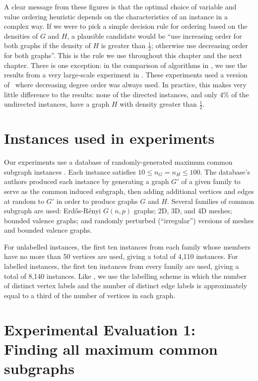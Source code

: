 A clear message from these figures is that the optimal choice of variable and
value ordering heuristic depends on the characteristics of an instance in a
complex way.  If we were to pick a simple decision rule for ordering based on
the densities of $G$ and $H$, a plausible candidate would be ``use increasing
order for both graphs if the density of $H$ is greater than $\frac{1}{2}$;
otherwise use decreasing order for both graphs''.  This is the rule we use
throughout this chapter and the next chapter.  There is one exception: in the
comparison of algorithms in , we use the
results from a very large-scale experiment in
\citet{DBLP:conf/ijcai/McCreeshPT17}. These experiments used a version of
\McSplit\ where decreasing degree order was always used.  In practice, this
makes very little difference to the results: none of the directed instances,
and only $4\%$ of the undirected instances, have a graph $H$ with density
greater than $\frac{1}{2}$.

\FloatBarrier

\section{Instances used in experiments}\label{sec:mcis-instances}

Our experiments use a database of randomly-generated maximum common subgraph
instances \citep{DBLP:journals/prl/SantoFSV03,DBLP:journals/jgaa/ConteFV07}.
Each instance satisfies $10 \leq n_G = n_H \leq 100$.  The database's authors
produced each instance by generating a graph $G'$ of a given family to serve as
the common induced subgraph, then adding additional vertices and edges at
random to $G'$ in order to produce graphs $G$ and $H$. Several families of
common subgraph are used: Erd\H{o}s-Rényi $G(n,p)$ graphs; 2D, 3D, and 4D meshes;
bounded valence graphs; and randomly perturbed (``irregular'') versions of
meshes and bounded valence graphs.

For unlabelled instances, the
first ten instances from each family whose members have no more than 50
vertices are used, giving a total of 4,110 instances.  For labelled instances,
the first ten instances from every family are used, giving a total of 8,140
instances. Like \citet{DBLP:conf/cp/McCreeshNPS16}, we use the labelling scheme
in which the number of distinct vertex labels and the number of distinct edge
labels is approximately equal to a third of the number of vertices in each
graph.

\section{Experimental Evaluation 1: Finding all maximum common subgraphs}
\label{sec:mcsplit-finding-all}


